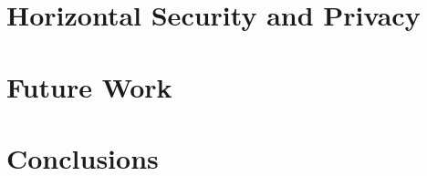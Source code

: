 \documentclass[sigconf, authordraft, anonymous]{acmart}
\theoremstyle{mydef}
\begin{document}
\section{Horizontal Security and Privacy}
\label{sec:privacy}


\section{Future Work}
\label{sec:futurework}


\section{Conclusions}
\label{sec:conclusion}




\end{document}
